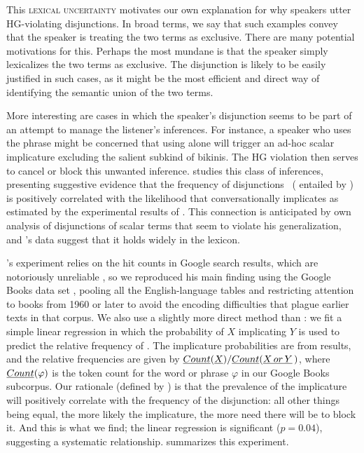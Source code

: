 \documentclass[12pt,twoside]{article}
\renewcommand{\_}{\textbf{\textunderscore\hspace{-4pt}\textunderscore\hspace{-3pt}\textunderscore\hspace{-4pt}\textunderscore}\hspace{0.5pt}}			%
\newcommand{\technicalTerm}[1]{\textsc{#1}}
\begin{document}
This \technicalTerm{lexical uncertainty} motivates our own explanation
for why speakers utter HG-violating disjunctions. In broad terms, we
say that such examples convey that the speaker is treating the two
terms as exclusive. There are many potential motivations for
this. Perhaps the most mundane is that the speaker simply lexicalizes
the two terms as exclusive. The disjunction is likely to be easily
justified in such cases, as it might be the most efficient and direct
way of identifying the semantic union of the two terms.

More interesting are cases in which the speaker's disjunction seems to
be part of an attempt to manage the listener's inferences. For
instance, a speaker who uses the phrase 
might be concerned that using  alone will trigger an
ad-hoc scalar implicature \citep{Hirschberg85} excluding the salient
subkind of bikinis. The HG violation then serves to cancel or block
this unwanted inference. \citet{Chemla-HurfordCounts} studies this
class of inferences, presenting suggestive evidence that the frequency
of disjunctions \XorY\ ( entailed by ) is positively
correlated with the likelihood that  conversationally
implicates  as estimated by the experimental results of
\citet{vanTiel-etal:2013}. This connection is anticipated by
 own analysis of disjunctions of scalar terms
that seem to violate his generalization, and
\citeauthor{Chemla-HurfordCounts}'s data suggest that it holds widely
in the lexicon.

\newcommand{\CountGB}{\emph{Count}}

\citeauthor{Chemla-HurfordCounts}'s experiment relies on the hit
counts in Google search results, which are notoriously unreliable
\citep{Liberman:2005}, so we reproduced his main finding using the
Google Books data set \citep{Michel-etal:2011}, pooling all the
English-language tables and restricting attention to books from 1960
or later to avoid the encoding difficulties that plague earlier texts
in that corpus. We also use a slightly more direct method than
\citeauthor{Chemla-HurfordCounts}: we fit a simple linear regression
in which the probability of $X$ implicating $Y$ is used to predict the
relative frequency of \XorY. The implicature probabilities are
from  results, and the relative
frequencies are given by
$\CountGB(\word{X\/}) / \CountGB(\XorY\,)$, where
$\CountGB(\varphi)$ is the token count for the word or phrase
$\varphi$ in our Google Books subcorpus. Our rationale (defined by
\citeauthor{Chemla-HurfordCounts}) is that the prevalence of the
implicature will positively correlate with the frequency of the
disjunction: all other things being equal, the more likely the
implicature, the more need there will be to block it. And this is what
we find; the linear regression is significant ($p = 0.04$), suggesting
a systematic relationship.  summarizes this
experiment.
\end{document}
